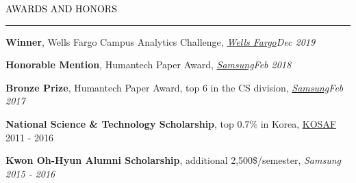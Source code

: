\documentclass{resume} %
\renewenvironment{rSection}[1]{
	\sectionskip
	\textcolor{Black}{\MakeUppercase{#1}}
	\sectionlineskip
	\hrule
	\begin{list}{}{
			\setlength{\leftmargin}{1.5em}
		}
		\item[]
	}{
	\end{list}
}
\begin{document}

%	


\begin{rSection}{Awards and Honors}
	\vspace*{-2.5mm}
	\begin{rSubsection}{}{}{}{}
		\item \textbf{Winner}, Wells Fargo Campus Analytics Challenge, \em{\href{https://www.wellsfargo.com/}{Wells Fargo}}\em \hfill Dec 2019
		\item \textbf{Honorable Mention}, Humantech Paper Award, \em{\href{https://humantech.samsung.com/saitext/index.jsp}{Samsung}}\em \hfill Feb 2018
		
		\item \textbf{Bronze Prize}, Humantech Paper Award, top 6 in the CS division, \em{\href{https://humantech.samsung.com/saitext/index.jsp}{Samsung}}\em \hfill Feb 2017
		
		\item \textbf{National Science \& Technology Scholarship}, top 0.7\% in Korea, \href{http://www.kosaf.go.kr/}{KOSAF} \hfill 2011 - 2016
		
		\item \textbf{Kwon Oh-Hyun Alumni Scholarship}, additional 2,500\$/semester, \em Samsung \em \hfill 2015 - 2016
		
	\end{rSubsection}

\end{rSection}
\end{document}
